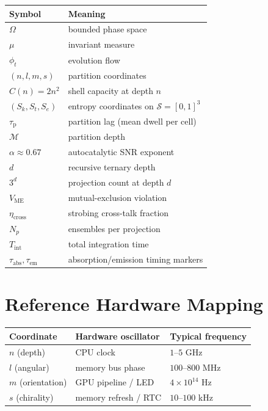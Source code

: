 \documentclass[twocolumn,11pt,a4paper]{article}
\theoremstyle{thmstyle}
\theoremstyle{axiomstyle}
\theoremstyle{definition}
\theoremstyle{remark}
\newcommand{\Sk}{S_{k}}
\newcommand{\St}{S_{t}}
\newcommand{\Se}{S_{e}}
\newcommand{\Sspace}{\mathcal{S}}
\newcommand{\Depth}{\mathcal{M}}
\newcommand{\Lag}{\tau_{\mathrm{p}}}
\newcommand{\Vme}{V_{\mathrm{ME}}}
\begin{document}
\begin{center}
\small
\begin{tabular}{ll}
\toprule
Symbol & Meaning\\
\midrule
$\Omega$ & bounded phase space\\
$\mu$ & invariant measure\\
$\phi_{t}$ & evolution flow\\
$(n,l,m,s)$ & partition coordinates\\
$C(n)=2n^{2}$ & shell capacity at depth $n$\\
$(\Sk,\St,\Se)$ & entropy coordinates on $\Sspace=[0,1]^{3}$\\
$\Lag$ & partition lag (mean dwell per cell)\\
$\Depth$ & partition depth\\
$\alpha\approx 0.67$ & autocatalytic SNR exponent\\
$d$ & recursive ternary depth\\
$3^{d}$ & projection count at depth $d$\\
$\Vme$ & mutual-exclusion violation\\
$\eta_{\mathrm{cross}}$ & strobing cross-talk fraction\\
$N_{p}$ & ensembles per projection\\
$T_{\mathrm{int}}$ & total integration time\\
$\tau_{\mathrm{abs}},\tau_{\mathrm{em}}$ & absorption/emission timing markers\\
\bottomrule
\end{tabular}
\end{center}

\section{Reference Hardware Mapping}
\label{app:hardware}

\begin{center}
\begin{tabular}{lll}
\toprule
Coordinate & Hardware oscillator & Typical frequency\\
\midrule
$n$ (depth) & CPU clock & $1$--$5$ GHz\\
$l$ (angular) & memory bus phase & $100$--$800$ MHz\\
$m$ (orientation) & GPU pipeline / LED & $4\times 10^{14}$ Hz\\
$s$ (chirality) & memory refresh / RTC & $10$--$100$ kHz\\
\bottomrule
\end{tabular}
\end{center}
\end{document}

